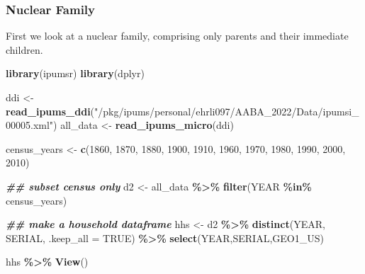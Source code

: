 \documentclass[
]{book}
\newenvironment{Shaded}{\begin{snugshade}}{\end{snugshade}}
\newcommand{\AttributeTok}[1]{\textcolor[rgb]{0.13,0.29,0.53}{#1}}
\newcommand{\ConstantTok}[1]{\textcolor[rgb]{0.56,0.35,0.01}{#1}}
\newcommand{\DecValTok}[1]{\textcolor[rgb]{0.00,0.00,0.81}{#1}}
\newcommand{\DocumentationTok}[1]{\textcolor[rgb]{0.56,0.35,0.01}{\textbf{\textit{#1}}}}
\newcommand{\FunctionTok}[1]{\textcolor[rgb]{0.13,0.29,0.53}{\textbf{#1}}}
\newcommand{\NormalTok}[1]{#1}
\newcommand{\OtherTok}[1]{\textcolor[rgb]{0.56,0.35,0.01}{#1}}
\newcommand{\SpecialCharTok}[1]{\textcolor[rgb]{0.81,0.36,0.00}{\textbf{#1}}}
\newcommand{\StringTok}[1]{\textcolor[rgb]{0.31,0.60,0.02}{#1}}
\begin{document}
\hypertarget{nuclear-family}{%
\subsubsection*{Nuclear Family}\label{nuclear-family}}

First we look at a nuclear family, comprising only parents and their immediate children.

\begin{Shaded}
\begin{Highlighting}[]
\FunctionTok{library}\NormalTok{(ipumsr)}
\FunctionTok{library}\NormalTok{(dplyr)}

\NormalTok{ddi }\OtherTok{\textless{}{-}} \FunctionTok{read\_ipums\_ddi}\NormalTok{(}\StringTok{"/pkg/ipums/personal/ehrli097/AABA\_2022/Data/ipumsi\_00005.xml"}\NormalTok{)}
\NormalTok{all\_data }\OtherTok{\textless{}{-}} \FunctionTok{read\_ipums\_micro}\NormalTok{(ddi)}

\NormalTok{census\_years }\OtherTok{\textless{}{-}} \FunctionTok{c}\NormalTok{(}\DecValTok{1860}\NormalTok{, }\DecValTok{1870}\NormalTok{, }\DecValTok{1880}\NormalTok{, }\DecValTok{1900}\NormalTok{, }\DecValTok{1910}\NormalTok{, }\DecValTok{1960}\NormalTok{, }\DecValTok{1970}\NormalTok{, }\DecValTok{1980}\NormalTok{, }\DecValTok{1990}\NormalTok{, }\DecValTok{2000}\NormalTok{, }\DecValTok{2010}\NormalTok{)}

\DocumentationTok{\#\# subset census only}
\NormalTok{d2 }\OtherTok{\textless{}{-}}\NormalTok{ all\_data }\SpecialCharTok{\%\textgreater{}\%} \FunctionTok{filter}\NormalTok{(YEAR }\SpecialCharTok{\%in\%}\NormalTok{ census\_years)}

\DocumentationTok{\#\# make a household dataframe}
\NormalTok{hhs }\OtherTok{\textless{}{-}}\NormalTok{ d2 }\SpecialCharTok{\%\textgreater{}\%} \FunctionTok{distinct}\NormalTok{(YEAR, SERIAL, }\AttributeTok{.keep\_all =} \ConstantTok{TRUE}\NormalTok{) }\SpecialCharTok{\%\textgreater{}\%} \FunctionTok{select}\NormalTok{(YEAR,SERIAL,GEO1\_US)}

\NormalTok{hhs }\SpecialCharTok{\%\textgreater{}\%} \FunctionTok{View}\NormalTok{()}
\end{Highlighting}
\end{Shaded}
\end{document}
